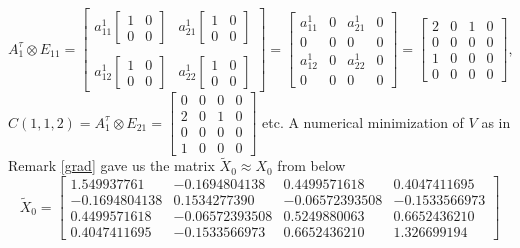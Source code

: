 \documentclass[12pt]{amsart}
\theoremstyle{definition}
\begin{document}
$$
A_{1}^\tau \otimes E_{11}=\left[ \begin{array}{cc} a^{1}_{11}\left[ \begin{array}{cc}1&0\\ 0& 0\end{array}\right] &  a^{1}_{21}\left[ \begin{array}{cc}1&0\\ 0& 0\end{array}\right] \\
\mbox{ } & \mbox{ }\\
 a^{1}_{12}\left[ \begin{array}{cc}1&0\\ 0& 0\end{array}\right] &  a^{1}_{22}\left[ \begin{array}{cc}1&0\\ 0& 0\end{array}\right] \end{array}\right] =
\left[ \begin{array}{cccc} a_{11}^1 & 0& a_{21}^1 & 0\\
0&0&0&0\\
a^{1}_{12}&0&a_{22}^1 &0\\
0&0&0&0\end{array}\right] =
\left[ \begin{array}{cccc} 2 & 0& 1 & 0\\
0&0&0&0\\
1&0&0 &0\\
0&0&0&0\end{array}\right]
,$$ 
$
C({1,1,2})=A_{1}^\tau \otimes E_{21} =\left[\begin{array}{cccc}
0 & 0 & 0 & 0\\
2 & 0 & 1 & 0\\
0 & 0 & 0 & 0\\
1 & 0 & 0 & 0
\end{array}  \right] 
$ etc. 
 A numerical minimization of $V$ as in Remark \ref{grad} gave us the matrix $\widetilde{X}_0 \approx X_0$ from below
$$
\widetilde{X}_0  =\left[
\begin{array}{rrrr}
1.549937761 &  -0.1694804138 &  0.4499571618 &  0.4047411695 \\ 
-0.1694804138 &  0.1534277390 &  -0.06572393508 &  -0.1533566973\\
0.4499571618 &  -0.06572393508 &  0.5249880063 &  0.6652436210\\ 
0.4047411695 &  -0.1533566973 &  0.6652436210 &  1.326699194
\end{array}\right]
$$
\end{document}

